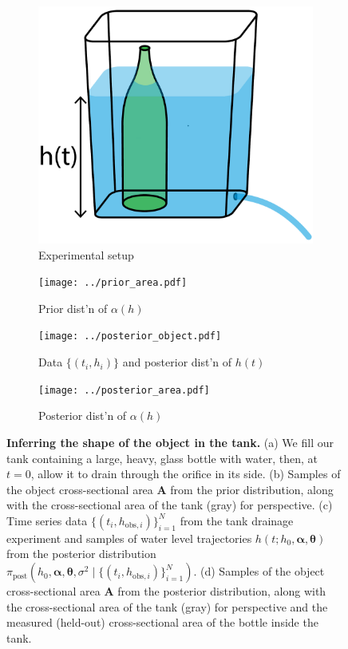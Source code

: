 \documentclass[openacc]{rsproca_new}%
\newcommand\thedata {$\{(t_i,h_{\text{obs}, i})\}_{i=1}^{N}$\xspace}
\newcommand\thedatanomath {\{(t_i,h_{\text{obs}, i})\}_{i=1}^{N}}
\newcommand\themodel {$h(t; h_0, \boldsymbol \alpha, \boldsymbol\theta)$\xspace}
\newcommand\thevars{h_0, \boldsymbol \alpha, \boldsymbol \theta, \sigma^2}
\begin{document}
\begin{figure}[h!]
    \centering
        \begin{subfigure}[b]{0.3\textwidth}
    	\includegraphics[width=\textwidth]{../tank_geometry/tank_w_bottle.pdf}
	\caption{Experimental setup} \label{fig:tank_w_bottle}
    \end{subfigure}
     \begin{subfigure}[b]{0.49\textwidth}
    	\texttt{[image: ../prior\_area.pdf]}
	\caption{Prior dist'n of $\alpha(h)$} \label{fig:prior_area}
    \end{subfigure}
    
     \begin{subfigure}[b]{0.49\textwidth}
    	\texttt{[image: ../posterior\_object.pdf]}
	\caption{Data $\{(t_i, h_i)\}$ and posterior dist'n of $h(t)$} \label{fig:posterior_object}
    \end{subfigure}
    \begin{subfigure}[b]{0.49\textwidth}
    	\texttt{[image: ../posterior\_area.pdf]}
	\caption{Posterior dist'n of $\alpha(h)$} \label{fig:posterior_area}
    \end{subfigure}

    \caption{
      \textbf{Inferring the shape of the object in the tank.} 
      (a) We fill our tank containing a large, heavy, glass bottle with water, then, at $t=0$, allow it to drain through the orifice in its side.
      (b) Samples of the object cross-sectional area $\mathbf{A}$ from the prior distribution, along with the cross-sectional area of the tank (gray) for perspective. 
      (c) Time series data \thedata from the tank drainage experiment and samples of water level trajectories \themodel from the posterior distribution $\pi_{\text{post}}(\thevars \mid \thedatanomath)$.
      (d) Samples of the object cross-sectional area $\mathbf{A}$ from the posterior distribution, along with the cross-sectional area of the tank (gray) for perspective and the measured (held-out) cross-sectional area of the bottle inside the tank. 
      }
\end{figure}
\end{document}
